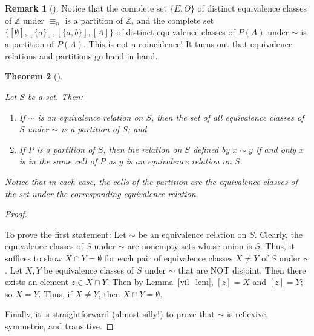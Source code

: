 \documentclass[10pt,]{book}
\theoremstyle{plain}
\newtheorem{theorem}{Theorem}[section]
\theoremstyle{definition}
\theoremstyle{definition}
\newtheorem{remark}[theorem]{Remark}
\theoremstyle{definition}
\theoremstyle{definition}
\numberwithin{equation}{section}
\def\Z{\mathbb{Z}}
\begin{document}
\begin{remark}[]\label{remark-37}
Notice that the  
complete set
    \(\{E,O\}\) of distinct equivalence classes of \(\Z\) under
    \(\equiv_n\) is a partition of \(\Z\), and the complete set
    \(\{[\emptyset],[\{a\}],[\{a,b\}],[A]\}\) of distinct equivalence
    classes of \(P(A)\) under \(\sim\) is a partition of \(P(A)\). This
    is not a coincidence! It turns out that equivalence relations
    and partitions go hand in hand.%
\end{remark}
\begin{theorem}[{}]\label{part_quiv}

        Let \(S\) be a set. Then:
        \leavevmode%
\begin{enumerate}
\item\hypertarget{li-405}{}
              If \(\sim\) is an equivalence relation on \(S\),
              then the set of all equivalence classes of \(S\) under
              \(\sim\) is a partition of \(S\); and
\item\hypertarget{li-406}{}
              If \(P\) is a partition of \(S\), then the relation on \(S\)
              defined by
              \(x\sim y\) if and only \(x\) is in the same
              cell of \(P\) as \(y\) is an equivalence relation on \(S\).
\end{enumerate}

\par

        Notice that in each case, the cells of the partition are the
        equivalence classes of the set under the corresponding equivalence
        relation.
\end{theorem}
\begin{proof}\hypertarget{proof-36}{}

      To prove the first statement: Let \(\sim\) be an equivalence relation on \(S\).
      Clearly, the equivalence classes of \(S\) under \(\sim\) are
      nonempty sets whose union is \(S\). Thus, it suffices to show \(X
      \cap Y =\emptyset\) for each pair of equivalence classes \(X\neq
      Y\) of \(S\) under \(\sim\). Let \(X,Y\) be equivalence classes of
      \(S\) under \(\sim\) that are NOT disjoint. Then there exists an
      element \(z\in X\cap Y\). Then by \hyperref[vil_lem]{Lemma~\ref{vil_lem}}, \([z]=X\)
      and \([z]=Y\); so \(X=Y\). Thus, if \(X\neq Y\), then \(X\cap Y
      =\emptyset\).
\par

      Finally, it is straightforward (almost silly!) to prove that
      \(\sim\) is reflexive, symmetric, and transitive.
\end{proof}
\end{document}
